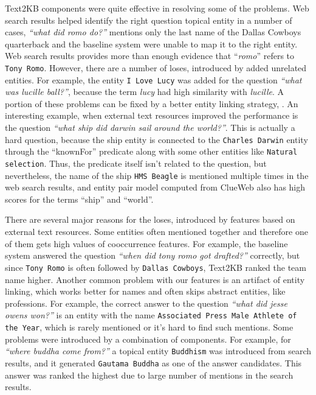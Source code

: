 Text2KB components were quite effective in resolving some of the problems.
Web search results helped identify the right question topical entity in a number of cases, \eg \textit{``what did romo do?''} mentions only the last name of the Dallas Cowboys quarterback and the baseline system were unable to map it to the right entity.
Web search results provides more than enough evidence that ``\textit{romo}'' refers to \texttt{Tony Romo}.
However, there are a number of loses, introduced by added unrelated entities.
For example, the entity \texttt{I Love Lucy} was added for the question \textit{``what was lucille ball?''}, because the term \textit{lucy} had high similarity with \textit{lucille}.
A portion of these problems can be fixed by a better entity linking strategy, \eg \cite{SMAPH_ERD:2014}.
An interesting example, when external text resources improved the performance is the question \textit{``what ship did darwin sail around the world?''}.
This is actually a hard question, because the ship entity is connected to the \texttt{Charles Darwin} entity through the ``knownFor'' predicate along with some other entities like \texttt{Natural selection}.
Thus, the predicate itself isn't related to the question, but nevertheless, the name of the ship \texttt{HMS Beagle} is mentioned multiple times in the web search results, and entity pair model computed from ClueWeb also has high scores for the terms ``ship'' and ``world''.

There are several major reasons for the loses, introduced by features based on external text resources.
Some entities often mentioned together and therefore one of them gets high values of cooccurrence features.
For example, the baseline system answered the question \textit{``when did tony romo got drafted?''} correctly, but since \texttt{Tony Romo} is often followed by \texttt{Dallas Cowboys}, Text2KB ranked the team name higher.
Another common problem with our features is an artifact of entity linking, which works better for names and often skips abstract entities, like professions.
For example, the correct answer to the question \textit{``what did jesse owens won?''} is an entity with the name \texttt{Associated Press Male Athlete of the Year}, which is rarely mentioned or it's hard to find such mentions.
Some problems were introduced by a combination of components.
For example, for \textit{``where buddha come from?''} a topical entity \texttt{Buddhism} was introduced from search results, and it generated \texttt{Gautama Buddha} as one of the answer candidates.
This answer was ranked the highest due to large number of mentions in the search results.

